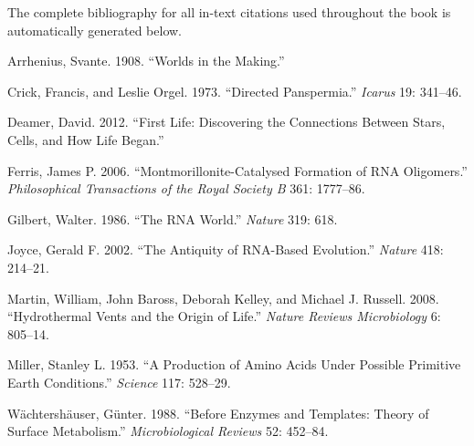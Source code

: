 \documentclass[
  oneside]{book}
\newlength{\cslhangindent}
\newenvironment{CSLReferences}[2] %
 {\begin{list}{}{%
  \setlength{\itemindent}{0pt}
  \setlength{\leftmargin}{0pt}
  \setlength{\parsep}{0pt}
  \ifodd #1
   \setlength{\leftmargin}{\cslhangindent}
   \setlength{\itemindent}{-1\cslhangindent}
  \fi
  \setlength{\itemsep}{#2\baselineskip}}}
 {\end{list}}
\begin{document}
The complete bibliography for all in-text citations used throughout the book is automatically generated below.

\label{refs}
\begin{CSLReferences}{1}{0}
Arrhenius, Svante. 1908. {``Worlds in the Making.''}

Crick, Francis, and Leslie Orgel. 1973. {``Directed Panspermia.''} \emph{Icarus} 19: 341--46.

Deamer, David. 2012. {``First Life: Discovering the Connections Between Stars, Cells, and How Life Began.''}

Ferris, James P. 2006. {``Montmorillonite-Catalysed Formation of RNA Oligomers.''} \emph{Philosophical Transactions of the Royal Society B} 361: 1777--86.

Gilbert, Walter. 1986. {``The RNA World.''} \emph{Nature} 319: 618.

Joyce, Gerald F. 2002. {``The Antiquity of RNA-Based Evolution.''} \emph{Nature} 418: 214--21.

Martin, William, John Baross, Deborah Kelley, and Michael J. Russell. 2008. {``Hydrothermal Vents and the Origin of Life.''} \emph{Nature Reviews Microbiology} 6: 805--14.

Miller, Stanley L. 1953. {``A Production of Amino Acids Under Possible Primitive Earth Conditions.''} \emph{Science} 117: 528--29.

Wächtershäuser, Günter. 1988. {``Before Enzymes and Templates: Theory of Surface Metabolism.''} \emph{Microbiological Reviews} 52: 452--84.

\end{CSLReferences}
\end{document}
